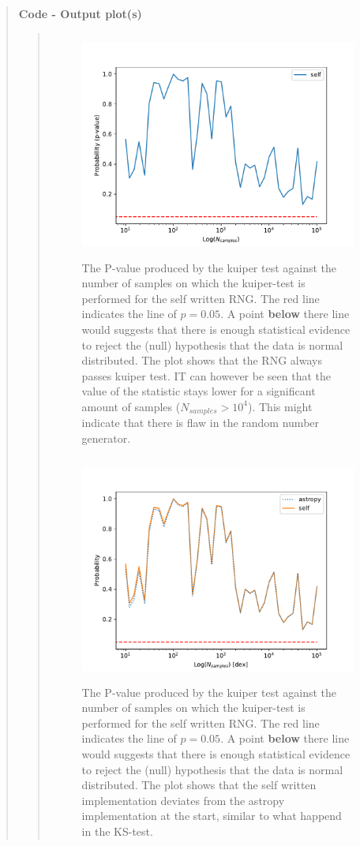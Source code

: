 \begin{quote}
\textbf{Code - Output plot(s)}
\begin{quote}
\begin{figure}[!ht]
\centering
\includegraphics[width=12cm, height=7.5cm]{./Plots/1_plot_kuiper_test_self.pdf}
\caption{The P-value produced by the kuiper test against the number of samples on which the kuiper-test is performed for the self written RNG. The red line indicates the line of $ p = 0.05$. A point \textbf{below} there  line would suggests that there is enough statistical evidence to reject the (null) hypothesis that the data is normal distributed. The plot shows that the RNG always passes kuiper test. IT can however be seen that the value of the statistic stays lower for a significant amount of samples ($ N_{samples} > 10^4$). This might indicate that there is flaw in the random number generator.}
\end{figure}

\begin{figure}[!hb]
\centering
\includegraphics[width=12cm, height=7.5cm]{./Plots/1_plot_kuiper_test_self_astropy.pdf}
\caption{The P-value produced by the kuiper test against the number of samples on which the kuiper-test is performed for the self written RNG. The red line indicates the line of $ p = 0.05$. A point \textbf{below} there  line would suggests that there is enough statistical evidence to reject the (null) hypothesis that the data is normal distributed. The plot shows that the self written implementation deviates from the astropy implementation at the start, similar to what happend in the KS-test.   }
\end{figure}

\end{quote}



\end{quote}

